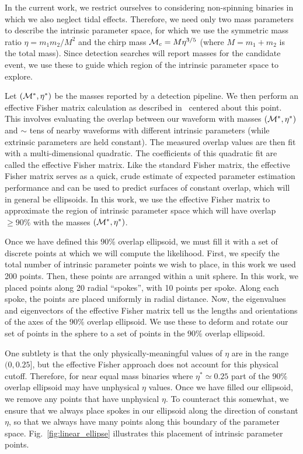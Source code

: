 In the current work, we restrict ourselves to considering non-spinning binaries in which we also neglect tidal
effects. Therefore, we need only two mass parameters to describe the intrinsic parameter space, for which we use
the symmetric mass ratio $\eta = m_1 m_2 / M^2$ 
and the chirp mass ${\cal M}_c = M \eta^{3/5}$ (where $M = m_1+m_2$ is the total mass).
Since detection searches will report masses for the candidate event, we use these
to guide which region of the intrinsic parameter space to explore.

Let $\left( {\cal M}^*,\eta^* \right)$ be the masses reported by a detection pipeline. We then perform an effective 
Fisher matrix calculation as described in~\cite{gwastro-mergers-HeeSuk-FisherMatrixWithAmplitudeCorrections,
gwastro-mergers-HeeSuk-CompareToPE-Aligned}
centered about this point.
This involves evaluating the overlap between our waveform with masses $\left( {\cal M}^*,\eta^* \right)$
and $\sim$ tens of nearby waveforms with different intrinsic parameters (while extrinsic parameters are held constant).
The measured overlap values are then fit with a multi-dimensional quadratic. 
The coefficients of this quadratic fit are called the effective Fisher matrix.
Like the standard Fisher matrix, the effective Fisher matrix serves as a quick, crude estimate of expected parameter
estimation performance and can be used to predict surfaces of constant overlap, which will in general be ellipsoids.
In this work, we use the effective Fisher matrix to approximate the region of intrinsic parameter space
which will have overlap $\geq 90\%$ with the masses $\left( {\cal M}^*,\eta^* \right)$.

Once we have defined this $90\%$ overlap ellipsoid, we must fill it with a set of discrete points 
at which we will compute the likelihood. First, we specify the total number of intrinsic parameter points we wish to place,
in this work we used 200 points. Then, these points are arranged within a unit sphere. In this work, we placed
points along 20 radial ``spokes'', with 10 points per spoke. Along each spoke, the points are placed 
uniformly in radial distance. Now, the eigenvalues and eigenvectors of the effective Fisher matrix tell us the lengths
and orientations of the axes of the $90\%$ overlap ellipsoid. We use these to deform and rotate our set
of points in the sphere to a set of points in the $90\%$ overlap ellipsoid.

One subtlety is that the only physically-meaningful values of $\eta$ are in the range $(0, 0.25]$, but the effective Fisher
approach does not account for this physical cutoff. Therefore, for near equal mass binaries where $\eta^* \simeq 0.25$
part of the $90\%$ overlap ellipsoid may have unphysical $\eta$ values. Once we have filled our ellipsoid, we remove
any points that have unphysical $\eta$. To counteract this somewhat, 
we ensure that we always place spokes in our ellipsoid along the direction of constant $\eta$,
so that we always have many points along this boundary of the parameter space.
Fig.~\ref{fig:linear_ellipse} illustrates this placement of intrinsic parameter points.


